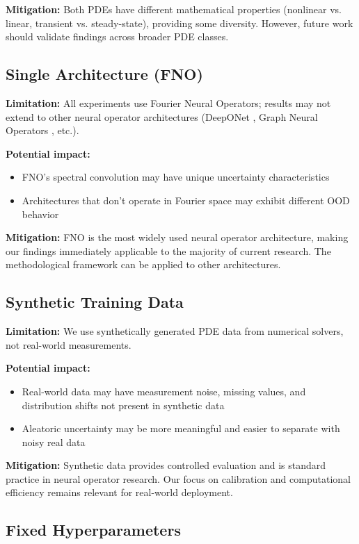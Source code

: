 \textbf{Mitigation:} Both PDEs have different mathematical properties (nonlinear vs. linear, transient vs. steady-state), providing some diversity. However, future work should validate findings across broader PDE classes.

\subsection{Single Architecture (FNO)}

\textbf{Limitation:} All experiments use Fourier Neural Operators; results may not extend to other neural operator architectures (DeepONet \cite{lu2021deeponet}, Graph Neural Operators \cite{li2020graph}, etc.).

\textbf{Potential impact:}
\begin{itemize}
\item FNO's spectral convolution may have unique uncertainty characteristics
\item Architectures that don't operate in Fourier space may exhibit different OOD behavior
\end{itemize}

\textbf{Mitigation:} FNO is the most widely used neural operator architecture, making our findings immediately applicable to the majority of current research. The methodological framework can be applied to other architectures.

\subsection{Synthetic Training Data}

\textbf{Limitation:} We use synthetically generated PDE data from numerical solvers, not real-world measurements.

\textbf{Potential impact:}
\begin{itemize}
\item Real-world data may have measurement noise, missing values, and distribution shifts not present in synthetic data
\item Aleatoric uncertainty may be more meaningful and easier to separate with noisy real data
\end{itemize}

\textbf{Mitigation:} Synthetic data provides controlled evaluation and is standard practice in neural operator research. Our focus on calibration and computational efficiency remains relevant for real-world deployment.

\subsection{Fixed Hyperparameters}

